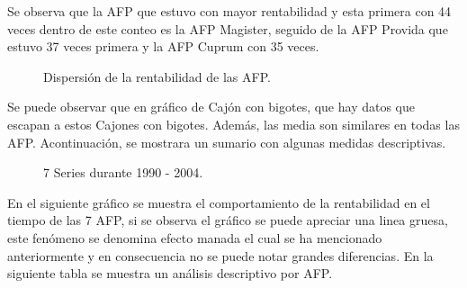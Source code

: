 Se observa que la AFP que estuvo con mayor rentabilidad y esta primera con 44 veces dentro de este conteo es la AFP Magister, seguido de la AFP Provida que estuvo 37 veces primera y la AFP Cuprum con 35 veces.

\begin{figure}[!htp]
\centering
{}
\caption{Dispersi\'on de la rentabilidad de las AFP.}
\label{caja}
\end{figure}

Se puede observar que en gr\'afico de Caj\'on con bigotes, que hay datos que escapan a estos Cajones con bigotes. Adem\'as, las media son similares en todas las AFP. Acontinuaci\'on, se mostrara un sumario con algunas medidas descriptivas.


\begin{figure}[!htp]
\centering
{}
\caption{7 Series durante 1990 - 2004.}
\label{caja}
\end{figure}

En el siguiente gr\'afico se muestra el comportamiento de la rentabilidad en el tiempo de las 7 AFP, si se observa el gr\'afico se puede apreciar una linea gruesa, este fen\'omeno se denomina efecto manada el cual se ha mencionado anteriormente y en consecuencia no se puede notar grandes diferencias. En la siguiente tabla se muestra un an\'alisis descriptivo por AFP.

